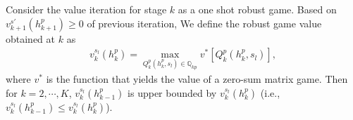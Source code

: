 \begin{theorem}
Consider the value iteration for stage $k$ as a one shot robust game. %
Based on $v_{k+1}^{s'}(h^{p}_{k+1}) \geq 0$ of previous iteration, 
We define the robust game value  obtained at $k$ as %
\begin{align}
v^{s_{l}}_{k}(h_{k}^{p})=\max_{Q_{k}^{p}(h^{p}_{k},s_{l})\in \mathbb{Q}_{kp}}v^*[Q_{k}^{p}(h^{p}_{k},s_{l})],%
\label{pickv}
\end{align}
where $v^*$ is the function that yields the value of a zero-sum matrix game. Then for $k=2,\cdots, K$, $v_{k}^{s_{l}}(h^{p}_{k-1})$ is upper bounded by $v_{k}^{s_{l}}(h_{k}^{p})$ (i.e.,~$v^{s_{l}}_{k}(h^{p}_{k-1})\leq v_{k}^{s_{l}}(h_{k}^{p})$).%
\label{robust}
\end{theorem}


